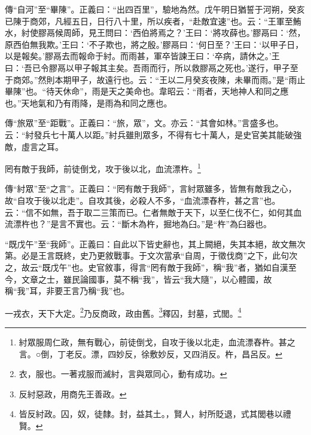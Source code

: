 {\noindent\zhuan{}\fzbyks 傳“自河”至“畢陳”。正義曰：“出四百里”，驗地為然。戊午明日猶誓于河朔，癸亥已陳于商郊，凡經五日，日行八十里，所以疾者，“赴敵宜速”也。云：“王軍至鮪水，紂使膠鬲候周師，見王問曰：‘西伯將焉之？’王曰：‘將攻薛也。’膠鬲曰：‘然，原西伯無我欺。’王曰：‘不子欺也，將之殷。’膠鬲曰：‘何日至？’王曰：‘以甲子日，以是報矣。’膠鬲去而報命于紂。而雨甚，軍卒皆諫王曰：‘卒病，請休之。’王曰：‘吾已令膠鬲以甲子報其主矣。吾雨而行，所以救膠鬲之死也。’遂行，甲子至于商郊。”然則本期甲子，故遠行也。云：“王以二月癸亥夜陳，未畢而雨。”是“雨止畢陳”也。“待天休命”，雨是天之美命也。韋昭云：“雨者，天地神人和同之應也。”天地氣和乃有雨降，是雨為和同之應也。 \par}

{\noindent\zhuan{}\fzbyks 傳“旅眾”至“距戰”。正義曰：“旅，眾”，文。亦云：“其會如林。”言盛多也。云：“紂發兵七十萬人以距。”紂兵雖則眾多，不得有七十萬人，是史官美其能破強敵，虛言之耳。 \par}

罔有敵于我師，前徒倒戈，攻于後以北，血流漂杵。\footnote{紂眾服周仁政，無有戰心，前徒倒戈，自攻于後以北走，血流漂舂杵。甚之言。○倒，丁老反。漂，四妙反，徐敷妙反，又四消反。杵，昌呂反。}

{\noindent\zhuan{}\fzbyks 傳“紂眾”至“之言”。正義曰：“罔有敵于我師”，言紂眾雖多，皆無有敵我之心，故“自攻于後以北走”。自攻其後，必殺人不多，“血流漂舂杵，甚之言”也。云：“信不如無，吾于取二三策而已。仁者無敵于天下，以至仁伐不仁，如何其血流漂杵也？”是言不實也。云：“斷木為杵，掘地為臼。”是“杵”為臼器也。 \par}

{\noindent\shu{}\fzkt “既戊午”至“我師”。正義曰：自此以下皆史辭也，其上闕絕，失其本絕，故文無次第。必是王言既終，史乃更敘戰事。于文次當承“自周，于徵伐商”之下，此句次之，故云“既戊午”也。史官敘事，得言“罔有敵于我師”，稱“我”者，猶如自漢至今，文章之士，雖民論國事，莫不稱“我”，皆云“我大隨”，以心體國，故稱“我”耳，非要王言乃稱“我”也。 \par}

一戎衣，天下大定。\footnote{衣，服也。一著戎服而滅紂，言與眾同心，動有成功。}乃反商政，政由舊。\footnote{反紂惡政，用商先王善政。}釋囚，封墓，式閭。\footnote{皆反紂政。囚，奴，徒隸。封，益其土。，賢人，紂所貶退，式其閭巷以禮賢。}

